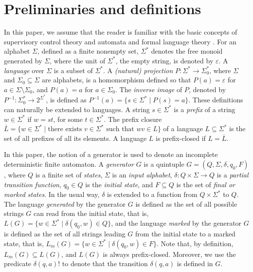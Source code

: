 \documentclass[preprint,1p,times]{elsarticle}
\newcommand{\eps}{\varepsilon}
\begin{document}
\section{Preliminaries and definitions}
	In this paper, we assume that the reader is familiar with the basic concepts of supervisory control theory \cite{CL08} and automata and formal language theory \cite{salomaa}. For an alphabet $\Sigma$, defined as a finite nonempty set, $\Sigma^*$ denotes the free monoid generated by $\Sigma$, where the unit of $\Sigma^*$, the empty string, is denoted by $\eps$. A {\em language\/} over $\Sigma$ is a subset of $\Sigma^*$. A {\em (natural) projection\/} $P: \Sigma^* \to \Sigma_0^*$, where $\Sigma$ and $\Sigma_0\subseteq \Sigma$ are alphabets, is a homomorphism defined so that $P(a) = \eps$ for $a\in \Sigma\setminus \Sigma_0$, and $P(a) = a$ for $a\in \Sigma_0$. The {\em inverse image} of $P$, denoted by $P^{-1} : \Sigma_0^* \to 2^{\Sigma^*}$, is defined as $P^{-1}(a)=\{s\in \Sigma^* \mid P(s) = a\}$. These definitions can naturally be extended to languages. A string $s\in \Sigma^*$ is a {\em prefix} of a string $w\in \Sigma^*$ if $w=st$, for some $t\in \Sigma^*$. The prefix closure $\overline{L}=\{w\in \Sigma^* \mid \text{there exists } v\in \Sigma^* \text{ such that } wv\in L\}$ of a language $L\subseteq \Sigma^*$ is the set of all prefixes of all its elements. A language $L$ is prefix-closed if $L=\overline{L}$.

  In this paper, the notion of a generator is used to denote an incomplete deterministic finite automaton. A {\em generator\/} $G$ is a quintuple $G=(Q,\Sigma,\delta,q_0,F)$, where $Q$ is a finite set of {\em states}, $\Sigma$ is an {\em input alphabet}, $\delta: Q \times \Sigma \to Q$ is a {\em partial transition function}, $q_0 \in Q$ is the {\em initial state}, and $F\subseteq Q$ is the set of {\em final or marked states}. In the usual way, $\delta$ is extended to a function from $Q \times \Sigma^*$ to $Q$. The language {\em generated\/} by the generator $G$ is defined as the set of all possible strings $G$ can read from the initial state, that is, $L(G) = \{w\in \Sigma^* \mid \delta(q_0,w)\in Q\}$, and the language {\em marked\/} by the generator $G$ is defined as the set of all strings leading $G$ from the initial state to a marked state, that is, $L_m(G) = \{w\in \Sigma^* \mid \delta(q_0,w)\in F\}$. Note that, by definition, $L_m(G)\subseteq L(G)$, and $L(G)$ is always prefix-closed. Moreover, we use the predicate $\delta(q,a)!$ to denote that the transition $\delta(q,a)$ is defined in $G$. 
\end{document}
